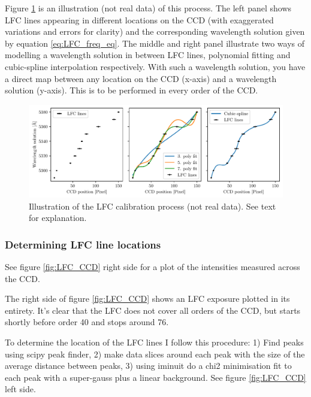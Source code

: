     Figure \ref{fig:calib_illustration} is an illustration (not real data) of this process. The left panel shows LFC lines appearing in different locations on the CCD (with exaggerated variations and errors for clarity) and the corresponding wavelength solution given by equation \ref{eq:LFC_freq_eq}. The middle and right panel illustrate two ways of modelling a wavelength solution in between LFC lines, polynomial fitting and cubic-spline interpolation respectively. With such a wavelength solution, you have a direct map between any location on the CCD (x-axis) and a wavelength solution (y-axis). This is to be performed in every order of the CCD.

    \begin{figure}%
        \begin{wide}  
            \includegraphics[width=\textwidth]{figures/calib/calib_illustration.pdf}
            \caption{Illustration of the LFC calibration process (not real data). See text for explanation.}
            \label{fig:calib_illustration}
        \end{wide}
    \end{figure}

    \subsubsection{Determining LFC line locations}

    See figure \ref{fig:LFC_CCD} right side for a plot of the intensities measured across the CCD.

    The right side of figure \ref{fig:LFC_CCD} shows an LFC exposure plotted in its entirety. It's clear that the LFC does not cover all orders of the CCD, but starts shortly before order 40 and stops around 76.
    
    To determine the location of the LFC lines I follow this procedure: 1) Find peaks using scipy peak finder, 2) make data slices around each peak with the size of the average distance between peaks, 3) using iminuit do a chi2 minimisation fit to each peak with a super-gauss plus a linear background. See figure \ref{fig:LFC_CCD} left side.

